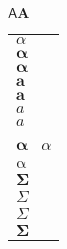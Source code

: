 \documentclass{standalone}
\begin{document}
\ensuremath{\boldsymbol{\mathsf{A}A}}

\begin{tabular}{l}
$ \alpha$  \\
$ \boldsymbol{\alpha} $ \\
$ \mathbf{\alpha} $ \\
$\boldsymbol{a}$ \\
$\mathbf{a}$ \\
$\boldsymbol{\mathit{a}}$ \\
$\mathbf{\mathit{a}}$ \\
$ \bm{\alpha} $ \
$ \mathit{\alpha} $ \\
$ \mathrm{\alpha} $ \\
$ \mathit{\boldsymbol{\Sigma}} $ \\
$ \boldsymbol{\mathit{\Sigma}}$ \\
$ \bm{\mathit{\Sigma}}$ \\
$ \mathit{\bm{\Sigma}}$ \\
\end{tabular}
\end{document}
